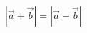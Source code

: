 \documentclass[border=0pt,12pt]{standalone}
\begin{document}
\fontsize{26}{31.2}\selectfont
$|\vec{a}+\vec{b}|=|\vec{a}-\vec{b}|$%
\end{document}
